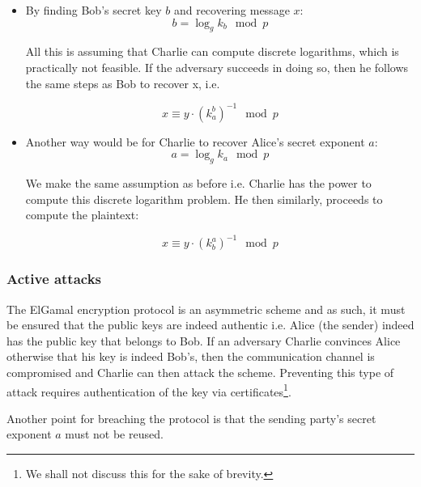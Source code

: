 \begin{itemize}
    \item By finding Bob's secret key \( b \) and recovering message \( x \):
        \begin{equation}
            b = \log_g k_b \mod p
        \end{equation}

        All this is assuming that Charlie can compute discrete logarithms, which is practically not feasible. 
        If the adversary succeeds in doing so, then he follows the same steps as Bob to recover x, i.e.

        \begin{equation}
            x \equiv y \cdot (k_a^b)^{-1} \mod p
        \end{equation}
        
    \item Another way would be for Charlie to recover Alice's secret exponent \( a \):
        \begin{equation}
            a = \log_g k_a \mod p
        \end{equation}
        
        We make the same assumption as before i.e. Charlie has the power to compute this discrete logarithm problem.
        He then similarly, proceeds to compute the plaintext:

        \begin{equation}
            x \equiv y \cdot (k_b^a)^{-1} \mod p     
        \end{equation}
\end{itemize}

\subsubsection{Active attacks}

The ElGamal encryption protocol is an asymmetric scheme and as such, it must be ensured that the public keys are indeed authentic i.e. Alice (the sender) indeed has the public key that belongs to Bob.
If an adversary Charlie convinces Alice otherwise that his key is indeed Bob's, then the communication channel is compromised and Charlie can then attack the scheme.
Preventing this type of attack requires authentication of the key via certificates\footnote{We shall not discuss this for the sake of brevity.}.

Another point for breaching the protocol is that the sending party's secret exponent \( a \) must not be reused.

